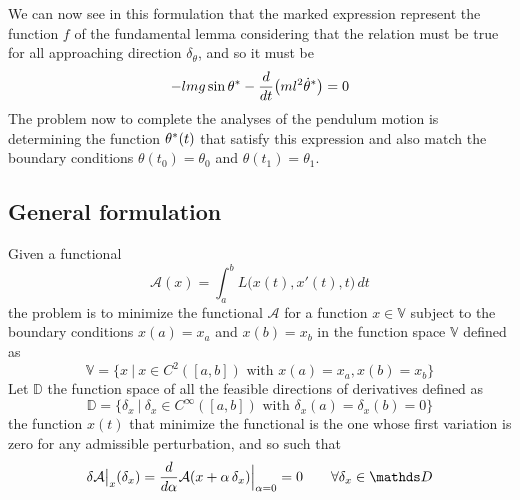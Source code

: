 	We can now see in this formulation that the marked expression represent the function $f$ of the fundamental lemma considering that the relation must be true for all approaching direction $\delta_\theta$, and so it must be
	\[ -lmg \sin\theta^* - \frac d{dt}\big(ml^2 \dot\theta^*\big) = 0 \]
	The problem now to complete the analyses of the pendulum motion is determining the function $\theta^*(t)$ that satisfy this expression and also match the boundary conditions $\theta(t_0) = \theta_0$ and $\theta(t_1)=\theta_1$.
	
	\subsection{General formulation} \label{sec:func:eullag}
	Given a functional
	\begin{equation}
		\mathcal A(x) = \int_a^b L \big(x(t),x'(t),t\big)\, dt
	\end{equation}
	the problem is to minimize the functional $\mathcal A$ for a function $x \in \mathds V$ subject to the boundary conditions $x(a) = x_a$ and $x(b) = x_b$ in the function space $\mathds V$ defined as
	\[ \mathds V = \big\{ x \ | \ x\in C^2([a,b]) \textrm{ with } x(a) = x_a,x(b) = x_b \big\} \]
	Let $\mathds D$ the function space of all the feasible directions of derivatives defined as
	\[ \mathds D = \big\{ \delta_x \ | \ \delta_x \in C^{\infty}([a,b]) \textrm{ with } \delta_x(a) = \delta_x(b) = 0 \big\} \]
	the function $x(t)$ that minimize the functional is the one whose first variation is zero for any admissible perturbation, and so such that
	\[ \delta \fun A\big|_x(\delta_x) = \frac{d}{d\alpha} \mathcal{A}(x+\alpha\, \delta_x) \Big|_{\alpha = 0} = 0 \qquad \forall \delta_x \in \mathds D \]	
	
